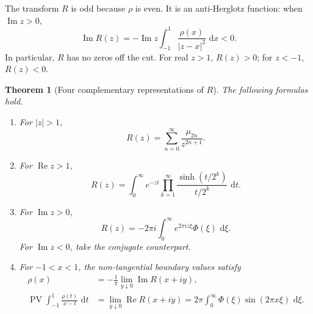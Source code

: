 \documentclass[11pt]{article}
\newtheorem{theorem}{Theorem}[section]
\theoremstyle{definition}
\theoremstyle{remark}
\newcommand{\dd}{\,\mathrm d}
\newcommand{\PV}{\operatorname{PV}}
\begin{document}
The transform \(R\) is odd because \(\rho\) is even.  It is an anti-Herglotz function:
when \(\operatorname{Im}z>0\),
\begin{equation}
 \operatorname{Im}R(z)
 =-\operatorname{Im}z\int_{-1}^{1}\frac{\rho(x)}{|z-x|^2}\,\dd x<0. \label{p3:eq:R-anti-Herglotz}
\end{equation}
In particular, \(R\) has no zeros off the cut.  For real \(z>1\), \(R(z)>0\); for
\(z<-1\), \(R(z)<0\).

\begin{theorem}[Four complementary representations of \(R\)]\label{p3:thm:R-representations}
The following formulas hold.

\begin{enumerate}[label=(\roman*)]
\item For \(|z|>1\),
\begin{equation}
 R(z)=\sum_{n=0}^{\infty}\frac{\mu_{2n}}{z^{2n+1}}.          \label{p3:eq:R-moment}
\end{equation}
\item For \(\operatorname{Re}z>1\),
\begin{equation}
 R(z)=\int_0^{\infty}e^{-zt}
 \prod_{k=1}^{\infty}\frac{\sinh(t/2^k)}{t/2^k}\,\dd t.    \label{p3:eq:R-Laplace}
\end{equation}
\item For \(\operatorname{Im}z>0\),
\begin{equation}
 R(z)=-2\pi i\int_0^{\infty}e^{2\pi i z\xi}\Phi(\xi)\,\dd\xi. \label{p3:eq:R-Fourier-Laplace}
\end{equation}
For \(\operatorname{Im}z<0\), take the conjugate counterpart.
\item For \(-1<x<1\), the non-tangential boundary values satisfy
\begin{align}
 \rho(x)&=-\frac1\pi\lim_{y\downarrow0}\operatorname{Im}R(x+iy),
                                                               \label{p3:eq:R-boundary-density}\\
 \PV\int_{-1}^{1}\frac{\rho(t)}{x-t}\,\dd t
 &=\lim_{y\downarrow0}\operatorname{Re}R(x+iy)
 =2\pi\int_0^{\infty}\Phi(\xi)\sin(2\pi x\xi)\,\dd\xi.     \label{p3:eq:R-boundary-Hilbert}
\end{align}
\end{enumerate}
\end{theorem}
\end{document}
